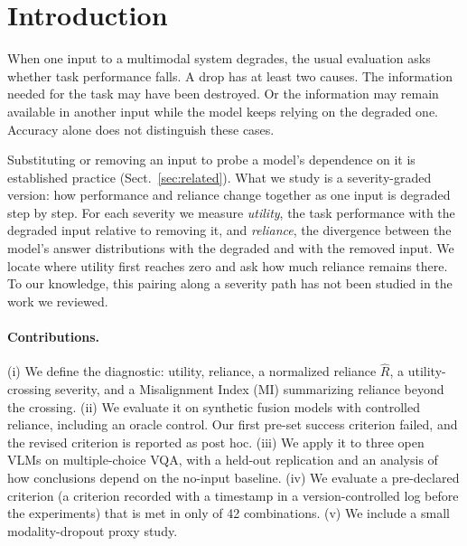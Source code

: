 \section{Introduction}
\label{sec:intro}

When one input to a multimodal system degrades, the usual evaluation asks
whether task performance falls. A drop has at least two causes. The
information needed for the task may have been destroyed. Or the information
may remain available in another input while the model keeps relying on the
degraded one. Accuracy alone does not distinguish these cases.

Substituting or removing an input to probe a model's dependence on it is
established practice (Sect.~\ref{sec:related}). What we study is a
severity-graded version: how performance and reliance change together as
one input is degraded step by step. For each severity we measure
\emph{utility}, the task performance with the degraded input relative to
removing it, and \emph{reliance}, the divergence between the model's
answer distributions with the degraded and with the removed input. We
locate where utility first reaches zero and ask how much reliance remains
there. To our knowledge, this pairing along a severity path has not been
studied in the work we reviewed.

\paragraph{Contributions.}
(i) We define the diagnostic: utility, reliance, a normalized reliance
$\hat R$, a utility-crossing severity, and a Misalignment Index (MI)
summarizing reliance beyond the crossing. (ii) We evaluate it on synthetic
fusion models with controlled reliance, including an oracle control. Our
first pre-set success criterion failed, and the revised criterion is
reported as post hoc. (iii) We apply it to three open VLMs on
multiple-choice VQA, with a held-out replication and an analysis of how
conclusions depend on the no-input baseline. (iv) We evaluate a pre-declared criterion (a criterion recorded with a timestamp in a version-controlled log before the experiments) that is met in only  of 42
combinations. (v) We
include a small modality-dropout proxy study.
